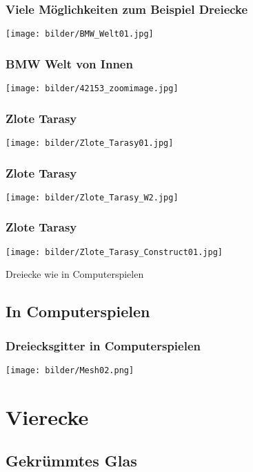\documentclass[12pt]{beamer}
\begin{document}
\begin{frame}
\frametitle{Viele M\"oglichkeiten zum Beispiel Dreiecke}
\texttt{[image: bilder/BMW\_Welt01.jpg]}
\end{frame}

\begin{frame}
\frametitle{BMW Welt von Innen}
\begin{center}
\texttt{[image: bilder/42153\_zoomimage.jpg]}
\end{center}
\end{frame}

\begin{frame}
\frametitle{Zlote Tarasy}
\begin{center}
\texttt{[image: bilder/Zlote\_Tarasy01.jpg]}
\end{center}
\end{frame}

\begin{frame}
\frametitle{Zlote Tarasy}
\begin{center}
\texttt{[image: bilder/Zlote\_Tarasy\_W2.jpg]}
\end{center}
\end{frame}

\begin{frame}
\frametitle{Zlote Tarasy}
\begin{center}
\texttt{[image: bilder/Zlote\_Tarasy\_Construct01.jpg]} \\
\end{center}
Dreiecke wie in Computerspielen
\end{frame}

\subsection{In Computerspielen}

\begin{frame}
\frametitle{Dreiecksgitter in Computerspielen}
\begin{center}
\texttt{[image: bilder/Mesh02.png]}
\end{center}
\end{frame}

\section{Vierecke}
\subsection{Gekr\"ummtes Glas}
\end{document}
